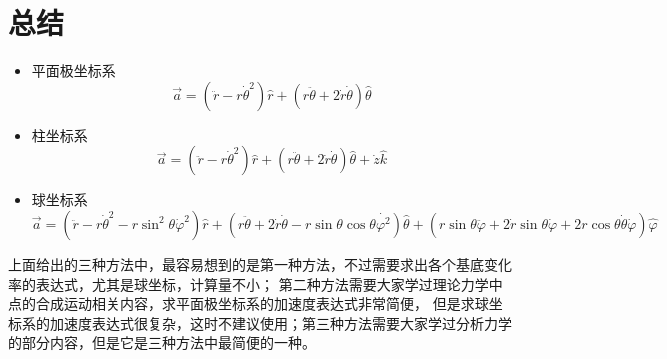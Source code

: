 \documentclass{ctexart}
\begin{document}
    \section{总结}\label{sec:5}

    \begin{itemize}
        \item 平面极坐标系
            \begin{equation*}
                \vec{a} = (\ddot{r}-r\dot{\theta}^2)\hat{r}+
                (r\ddot{\theta}+2\dot{r}\dot{\theta})\hat{\theta}
            \end{equation*}
        \item 柱坐标系
            \begin{equation*}
                \vec{a} = (\ddot{r}-r\dot{\theta}^2)\hat{r}+
                (r\ddot{\theta}+2\dot{r}\dot{\theta})\hat{\theta}+
                \dot{z}\hat{k}
            \end{equation*}
        \item 球坐标系
            \begin{equation*}
                \vec{a} = (\ddot{r}-r\dot{\theta}^2-r\sin^2\theta\dot{\varphi}^2)\hat{r}+
                (r\ddot{\theta}+2\dot{r}\dot{\theta}-r\sin\theta\cos\theta\dot{\varphi^2})\hat{\theta}+
                (r\sin\theta\ddot{\varphi}+2\dot{r}\sin\theta\dot{\varphi}+
                2r\cos\theta\dot{\theta}\dot{\varphi})\hat{\varphi}
            \end{equation*}
    \end{itemize}

    上面给出的三种方法中，最容易想到的是第一种方法，不过需要求出各个基底变化率的表达式，尤其是球坐标，计算量不小；
    第二种方法需要大家学过理论力学中点的合成运动相关内容，求平面极坐标系的加速度表达式非常简便，
    但是求球坐标系的加速度表达式很复杂，这时不建议使用；第三种方法需要大家学过分析力学的部分内容，但是它是三种方法中最简便的一种。
\end{document}
